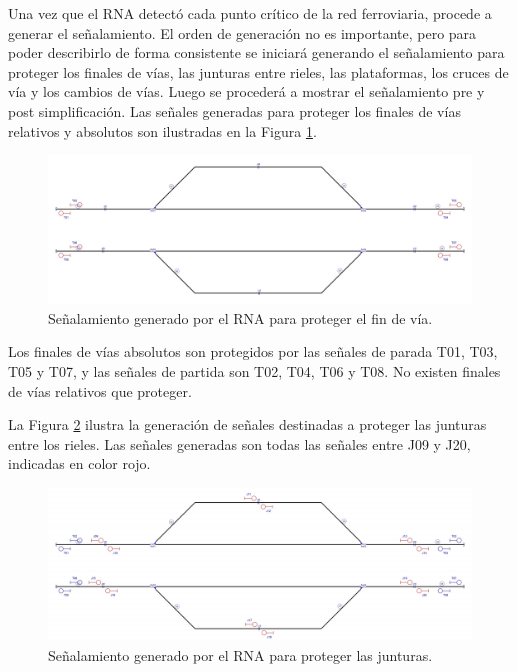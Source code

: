 	Una vez que el RNA detectó cada punto crítico de la red ferroviaria, procede a generar el señalamiento. El orden de generación no es importante, pero para poder describirlo de forma consistente se iniciará generando el señalamiento para proteger los finales de vías, las junturas entre rieles, las plataformas, los cruces de vía y los cambios de vías. Luego se procederá a mostrar el señalamiento pre y post simplificación. Las señales generadas para proteger los finales de vías relativos y absolutos son ilustradas en la Figura \ref{fig:EJ5_3}.
	
	\begin{figure}[H]
		\centering
		\includegraphics[width=1\textwidth]{resultados-obtenidos/ejemplo5/images/5_step1.png}
		\centering\caption{Señalamiento generado por el RNA para proteger el fin de vía.}
		\label{fig:EJ5_3}
	\end{figure}
	
	Los finales de vías absolutos son protegidos por las señales de parada T01, T03, T05 y T07, y las señales de partida son T02, T04, T06 y T08. No existen finales de vías relativos que proteger.
	
	La Figura \ref{fig:EJ5_4} ilustra la generación de señales destinadas a proteger las junturas entre los rieles. Las señales generadas son todas las señales entre J09 y J20, indicadas en color rojo.
	
	\begin{figure}[H]
		\centering
		\includegraphics[width=1\textwidth]{resultados-obtenidos/ejemplo5/images/5_step2.png}
		\centering\caption{Señalamiento generado por el RNA para proteger las junturas.}
		\label{fig:EJ5_4}
	\end{figure}
	
